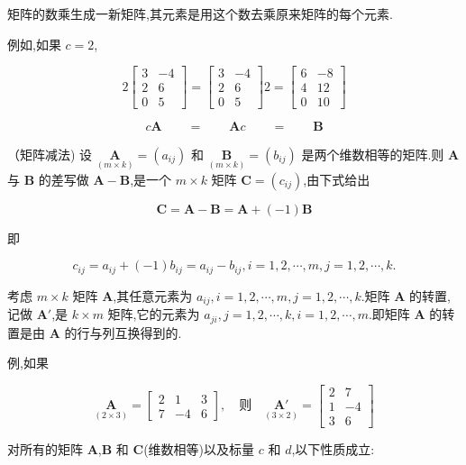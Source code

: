 
矩阵的数乘生成一新矩阵,其元素是用这个数去乘原来矩阵的每个元素.

例如,如果 $c=2$,

\[
2 \begin{bmatrix} 3 & -4 \\ 2 & 6 \\ 0 & 5 \end{bmatrix} = \begin{bmatrix} 3 & -4 \\ 2 & 6 \\ 0 & 5 \end{bmatrix} 2 = \begin{bmatrix} 6 & -8 \\ 4 & 12 \\ 0 & 10 \end{bmatrix}
\]

\[
\underset{}{c\bm{A}} \qquad = \qquad \underset{}{\bm{A}c} \qquad = \qquad \underset{}{\bm{B}}
\]

 \quad （矩阵减法) \quad 设 $\underset{(m \times k)}{\bm{A}} = (a_{ij})$ 和 $\underset{(m \times k)}{\bm{B}} = (b_{ij})$ 是两个维数相等的矩阵.则 $\bm{A}$ 与 $\bm{B}$ 的差写做 $\bm{A} - \bm{B}$,是一个 $m \times k$ 矩阵 $\bm{C} = (c_{ij})$,由下式给出

\[
\bm{C} = \bm{A} - \bm{B} = \bm{A} + (-1)\bm{B}
\]

即

\[
c_{ij} = a_{ij} + (-1)b_{ij} = a_{ij} - b_{ij} ,i=1,2,\cdots ,m,j=1,2,\cdots ,k.
\]

 \quad 考虑 $m \times k$ 矩阵 $\bm{A}$,其任意元素为 $a_{ij} ,i=1,2,\cdots ,m,j=1,2,\cdots ,k$.矩阵 $\bm{A}$ 的转置,记做 $\bm{A}'$,是 $k \times m$ 矩阵,它的元素为 $a_{ji} ,j=1,2,\cdots ,k,i=1,2,\cdots ,m$.即矩阵 $\bm{A}$ 的转置是由 $\bm{A}$ 的行与列互换得到的.

例,如果

\[
\underset{(2 \times 3)}{\bm{A}} = \begin{bmatrix} 2 & 1 & 3 \\ 7 & -4 & 6 \end{bmatrix}, \quad \text{则} \quad
\underset{(3 \times 2)}{\bm{A}'} = \begin{bmatrix} 2 & 7 \\ 1 & -4 \\ 3 & 6 \end{bmatrix}
\]

 \quad 对所有的矩阵 $\bm{A}$,$\bm{B}$ 和 $\bm{C}$(维数相等)以及标量 $c$ 和 $d$,以下性质成立:

